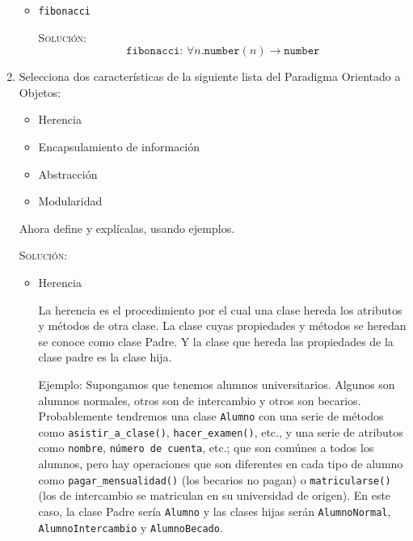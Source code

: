 \documentclass[letterpaper,11pt]{article}
\begin{document}
\begin{enumerate}
\begin{itemize}
        \item \texttt{fibonacci}
        
        \textsc{Solución:} 
        \begin{equation*}
            \texttt{fibonacci: } \forall n. \texttt{number}(n) \rightarrow 
            \texttt{number}
        \end{equation*}
    \end{itemize}

    \item Selecciona dos características de la siguiente lista del Paradigma 
    Orientado a Objetos:
    \begin{itemize}
        \item Herencia
        \item Encapsulamiento de información
        \item Abstracción
        \item Modularidad
    \end{itemize}

    Ahora define y explícalas, usando ejemplos.

    \textsc{Solución:}
    \begin{itemize}
        \item Herencia

        La herencia es el procedimiento por el cual una clase hereda los 
        atributos y métodos de otra clase. La clase cuyas propiedades y métodos 
        se heredan se conoce como clase Padre. Y la clase que hereda las 
        propiedades de la clase padre es la clase hija.

        Ejemplo: Supongamos que tenemos alumnos universitarios. Algunos son 
        alumnos normales, otros son de intercambio y otros son becarios. 
        Probablemente tendremos una clase \texttt{Alumno} con una serie de 
        métodos como \texttt{asistir\_a\_clase()}, \texttt{hacer\_examen()}, 
        etc., y una serie de atributos como \texttt{nombre}, \texttt{número de 
        cuenta}, etc.; que son comúnes a todos los alumnos, pero hay operaciones 
        que son diferentes en cada tipo de alumno como 
        \texttt{pagar\_mensualidad()} (los becarios no pagan) o 
        \texttt{matricularse()} (los de intercambio se matriculan en su 
        universidad de origen). En este caso, la clase Padre sería 
        \texttt{Alumno} y las clases hijas serán \texttt{AlumnoNormal},
        \texttt{AlumnoIntercambio} y \texttt{AlumnoBecado}.


\end{itemize}
\end{enumerate}
\end{document}
